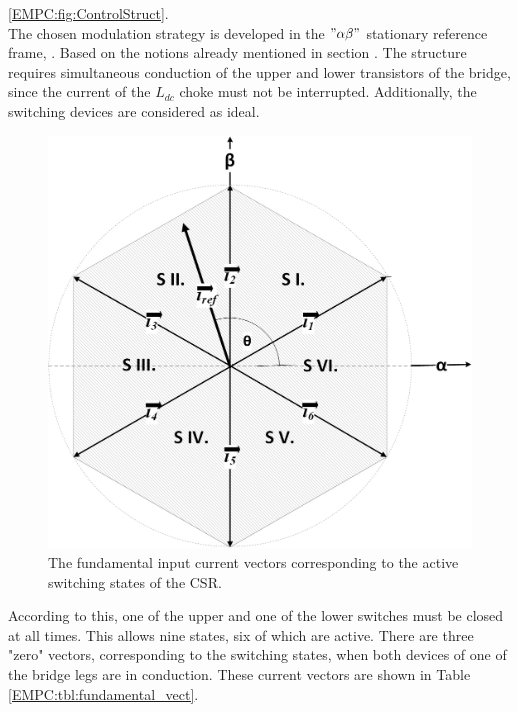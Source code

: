      \ref{EMPC:fig:ControlStruct}.  \\
     The chosen modulation strategy is developed in the $"\alpha\beta"$ stationary reference frame, . Based on the notions already mentioned in section . The structure requires simultaneous conduction of the upper and lower transistors of the bridge, since the current of the $L_{dc}$  choke must not be interrupted. Additionally, the switching devices are considered as ideal.

    \begin{figure}[!ht]
        \centering
        \includegraphics[width=.6\textwidth]{EMPC_PNG_Pics/VectorPhasor.png}
        \caption{The fundamental input current vectors corresponding to the active switching states of the CSR.}
        \label{EMPC:fig:VectorPhasor}
    \end{figure}

    According to this, one of the upper and one of the lower switches must be closed at all times. This allows nine states, six of which are active. There are three "zero" vectors, corresponding to the switching states, when both devices of one of the bridge legs are in conduction. These current vectors are shown in Table \ref{EMPC:tbl:fundamental_vect}.


